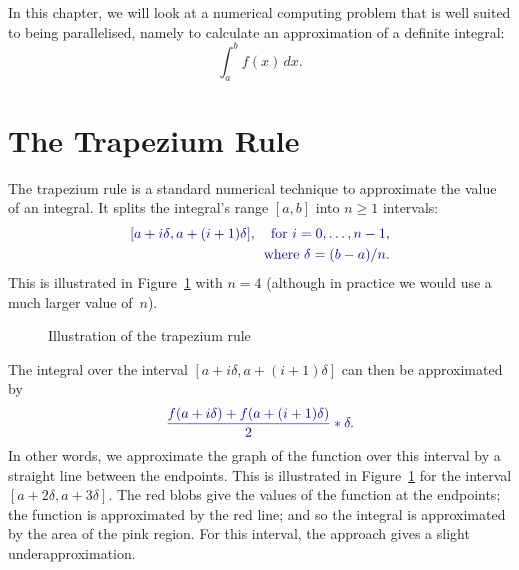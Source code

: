In this chapter, we will look at a numerical computing problem that is well
suited to being parallelised, namely to calculate an approximation of a definite
integral:
\[
\int_a^b f(x) \, dx .
\]


\section{The Trapezium Rule}

The trapezium rule is a standard numerical technique to approximate the value
of an integral.  It splits the integral's range $[a,b]$ into $n \ge 1$
intervals:
\[\mstyle
\begin{align}
[{a+i\delta}, a+(i+1)\delta], 
  \quad\mbox{for $i = 0, \ldots, n-1$,} \\
\mbox{where $\delta = (b-a)/n$.}
\end{align}
\]
This is illustrated in Figure~\ref{fig:trapezium} with $n = 4$
(although in practice we would use a much larger value of~$n$).


\begin{figure}
\begin{center}
\def\labY{-0.16}
\def\fn{\x^3/240 + \x^2/10 - 0.5*\x + 1.5}   %
\end{center}
\caption{Illustration of the trapezium rule}
\label{fig:trapezium}
\end{figure}


The integral over the interval $[a+i\delta, a+(i+1)\delta]$ can then be
approximated by 
\[\mstyle
\frac{f(a+i\delta)+f(a+(i+1)\delta)}{2} * \delta.
\]
In other words, we approximate the graph of the function over this interval by
a straight line between the endpoints.  This is illustrated in
Figure~\ref{fig:trapezium} for the interval $[a+2\delta, a+3\delta]$.  The red
blobs give the values of the function at the endpoints; the function is
approximated by the red line; and so the integral is approximated by the area
of the pink region.  For this interval, the approach gives a slight
underapproximation. 

